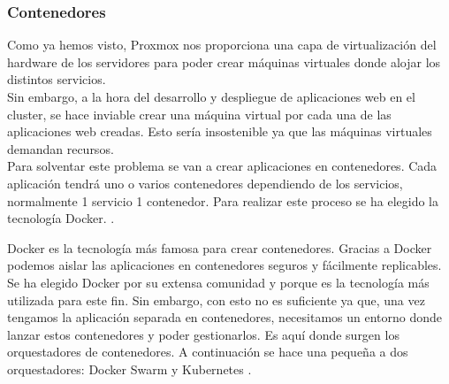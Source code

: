 \subsubsection{Contenedores}
\begin{text}
	Como ya hemos visto, Proxmox nos proporciona una capa de virtualización del hardware de los servidores para poder crear máquinas virtuales donde alojar los distintos servicios. \\
	Sin embargo, a la hora del desarrollo y despliegue de aplicaciones web en el cluster, se hace inviable crear una máquina virtual por cada una de las aplicaciones web creadas. Esto sería insostenible ya que las máquinas virtuales demandan recursos. \\
	
	Para solventar este problema se van a crear aplicaciones en contenedores. Cada aplicación tendrá uno o varios contenedores dependiendo de los servicios, normalmente 1 servicio 1 contenedor. Para realizar este proceso se ha elegido la tecnología Docker. \cite{docker:online}.
\end{text}

\begin{text}
	Docker es la tecnología más famosa para crear contenedores. Gracias a Docker podemos aislar las aplicaciones en contenedores seguros y fácilmente replicables. Se ha elegido Docker por su extensa comunidad y porque es la tecnología más utilizada para este fin. Sin embargo, con esto no es suficiente ya que, una vez tengamos la aplicación separada en contenedores, necesitamos un entorno donde lanzar estos contenedores y poder gestionarlos. Es aquí donde surgen los orquestadores de contenedores. A continuación se hace una pequeña a dos orquestadores: Docker Swarm \cite{swarm:online} y Kubernetes \cite{k8:online}.
\end{text}

